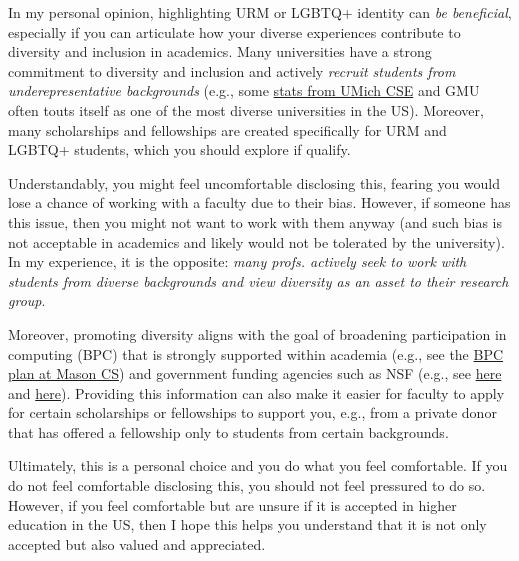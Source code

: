 \documentclass[oneside,11pt,dvipsnames]{book}
\begin{document}

In my personal opinion, highlighting URM or LGBTQ+ identity can \emph{be beneficial}, especially if you can articulate how your diverse experiences contribute to diversity and inclusion in academics.  Many universities have a strong commitment to diversity and inclusion and actively
\emph{recruit students from underepresentative backgrounds} (e.g., some \href{https://cse-climate.engin.umich.edu/reports/climate-dei-reports/cse-climate-and-dei-report-2022-2023/#grad-ethnicity}{stats from UMich CSE} and GMU often touts itself as one of the most diverse universities in the US). Moreover, many scholarships and fellowships are created specifically for URM and LGBTQ+ students, which you should explore if qualify.

Understandably, you might feel uncomfortable disclosing this, fearing you would lose a chance of working with a faculty due to their bias.  However, if someone has this issue, then you might not want to work with them anyway (and such bias is not acceptable in academics and likely would not be tolerated by the university). In my experience, it is the opposite: \emph{many profs. actively seek to work with students from diverse backgrounds and view diversity as an asset to their research group}.

Moreover, promoting diversity aligns with the goal of broadening participation in computing (BPC) that is strongly supported within academia (e.g., see the \href{https://plans.bpcnet.org/GeorgeMasonUniversity_ComputerScience_DepartmentalBPCPlan.pdf}{BPC plan at Mason CS}) and government funding agencies such as NSF (e.g., see \href{https://new.nsf.gov/cise/broadening-participation}{here} and \href{https://www.nsf.gov/pubs/2022/nsf22125/nsf22125.jsp}{here}).
Providing this information can also make it easier for faculty to apply for certain scholarships or fellowships to support you, e.g., from a private donor that has offered a fellowship only to students from certain backgrounds.

Ultimately, this is a personal choice and you do what you feel comfortable.
If you do not feel comfortable disclosing this, you should not feel pressured to do so.
However, if you feel comfortable but are unsure if it is accepted in higher education in the US, then I hope this helps you understand that it is not only accepted but also valued and appreciated.
\end{document}

